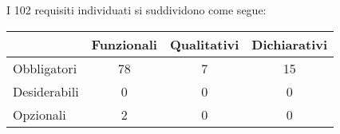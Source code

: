 I 102 requisiti individuati si suddividono come segue:
\begin{center}
  \centering
  \begin{tabular}{|l|c|c|c|}
    \hline
		& Funzionali & Qualitativi & Dichiarativi   \\
\hline
Obbligatori &      78     &    7     & 15       \\
\hline
Desiderabili &     0     &	  0     & 0    \\
\hline
Opzionali   &      2     &    0     & 0    \\
\hline
  \end{tabular}
\end{center}

